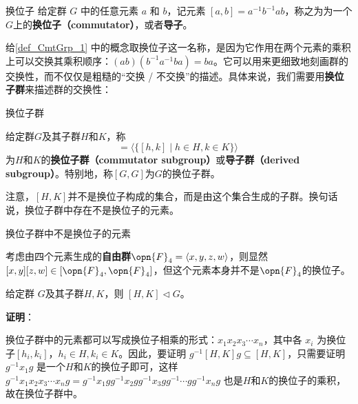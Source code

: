 


\begin{definition}{换位子}\label{def_CmtGrp_1}
给定群 $G$ 中的任意元素 $a$ 和 $b$，记元素 $[a, b]=a^{-1}b^{-1}ab$，称之为为一个$G$上的\textbf{换位子（commutator）}，或者\textbf{导子}。
\end{definition}

给\autoref{def_CmtGrp_1} 中的概念取换位子这一名称，是因为它作用在两个元素的乘积上可以交换其乘积顺序：$(ab)(b^{-1}a^{-1}ba)=ba$。它可以用来更细致地刻画群的交换性，而不仅仅是粗糙的“交换 / 不交换”的描述。具体来说，我们需要用\textbf{换位子群}来描述群的交换性：

\begin{definition}{换位子群}

给定群$G$及其子群$H$和$K$，称
\begin{equation}
[H, K] = \langle \{[h, k]\mid h\in H, k\in K\} \rangle~
\end{equation}
为$H$和$K$的\textbf{换位子群（commutator subgroup）}或\textbf{导子群（derived subgroup）}。特别地，称$[G, G]$为$G$的换位子群。

\end{definition}

注意，$[H, K]$并不是换位子构成的集合，而是由这个集合生成的子群。换句话说，换位子群中存在不是换位子的元素。

\begin{example}{换位子群中不是换位子的元素}

考虑由四个元素生成的\textbf{自由群}$\opn{F}_4=\langle x, y, z, w \rangle$，则显然$[x, y][z, w]\in [\opn{F}_4, \opn{F}_4]$，但这个元素本身并不是$\opn{F}_4$的换位子。

\end{example}

\begin{theorem}{}
给定群 $G$及其子群$H, K$，则 $[H, K]\triangleleft G$。
\end{theorem}

\textbf{证明}：

换位子群中的元素都可以写成换位子相乘的形式：$x_1x_2x_3\cdots x_n$，其中各 $x_i$ 为换位子$[h_i, k_i]$，$h_i\in H, k_i\in K$。因此，要证明 $g^{-1}[H, K]g\subseteq [H, K]$，只需要证明 $g^{-1}x_1g$ 是一个$H$和$K$的换位子即可，这样 $g^{-1}x_1x_2x_3\cdots x_ng=g^{-1}x_1gg^{-1}x_2gg^{-1}x_3gg^{-1}\cdots gg^{-1}x_ng$ 也是$H$和$K$的换位子的乘积，故在换位子群中。

